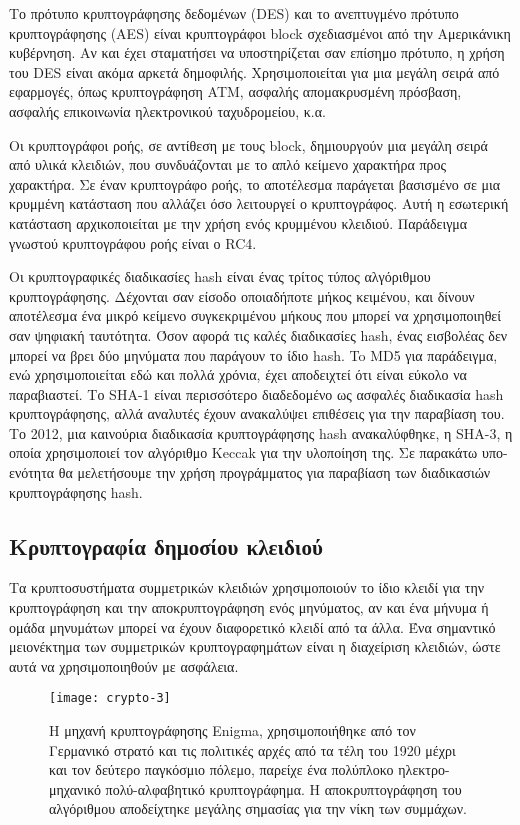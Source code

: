 Το πρότυπο κρυπτογράφησης δεδομένων (DES) και το ανεπτυγμένο πρότυπο κρυπτογράφησης (AES) είναι κρυπτογράφοι block σχεδιασμένοι από την Αμερικάνικη κυβέρνηση. Αν και έχει σταματήσει να υποστηρίζεται σαν επίσημο πρότυπο, η χρήση του DES είναι ακόμα αρκετά δημοφιλής. Χρησιμοποιείται για μια μεγάλη σειρά από εφαρμογές, όπως κρυπτογράφηση ATM, ασφαλής απομακρυσμένη πρόσβαση, ασφαλής επικοινωνία ηλεκτρονικού ταχυδρομείου, κ.α.

Οι κρυπτογράφοι ροής, σε αντίθεση με τους block, δημιουργούν μια μεγάλη σειρά από υλικά κλειδιών, που συνδυάζονται με το απλό κείμενο χαρακτήρα προς χαρακτήρα. Σε έναν κρυπτογράφο ροής, το αποτέλεσμα παράγεται βασισμένο σε μια κρυμμένη κατάσταση που αλλάζει όσο λειτουργεί ο κρυπτογράφος. Αυτή η εσωτερική κατάσταση αρχικοποιείται με την χρήση ενός κρυμμένου κλειδιού. Παράδειγμα γνωστού κρυπτογράφου ροής είναι ο RC4.

Οι κρυπτογραφικές διαδικασίες hash είναι ένας τρίτος τύπος αλγόριθμου κρυπτογράφησης. Δέχονται σαν είσοδο οποιαδήποτε μήκος κειμένου, και δίνουν αποτέλεσμα ένα μικρό κείμενο συγκεκριμένου μήκους που μπορεί να χρησιμοποιηθεί σαν ψηφιακή ταυτότητα. Όσον αφορά τις καλές διαδικασίες hash, ένας εισβολέας δεν μπορεί να βρει δύο μηνύματα που παράγουν το ίδιο hash. To MD5 για παράδειγμα, ενώ χρησιμοποιείται εδώ και πολλά χρόνια, έχει αποδειχτεί ότι είναι εύκολο να παραβιαστεί. Το SHA-1 είναι περισσότερο διαδεδομένο ως ασφαλές διαδικασία hash κρυπτογράφησης, αλλά αναλυτές έχουν ανακαλύψει επιθέσεις για την παραβίαση του. Το 2012, μια καινούρια διαδικασία κρυπτογράφησης hash ανακαλύφθηκε, η SHA-3, η οποία χρησιμοποιεί τον αλγόριθμο Keccak για την υλοποίηση της. Σε παρακάτω υπο-ενότητα θα μελετήσουμε την χρήση προγράμματος για παραβίαση των διαδικασιών κρυπτογράφησης hash.
\subsection{Κρυπτογραφία δημοσίου κλειδιού}
Τα κρυπτοσυστήματα συμμετρικών κλειδιών χρησιμοποιούν το ίδιο κλειδί για την κρυπτογράφηση και την αποκρυπτογράφηση ενός μηνύματος, αν και ένα μήνυμα ή ομάδα μηνυμάτων μπορεί να έχουν διαφορετικό κλειδί από τα άλλα. Ένα σημαντικό μειονέκτημα των συμμετρικών κρυπτογραφημάτων είναι η διαχείριση κλειδιών, ώστε αυτά να χρησιμοποιηθούν με ασφάλεια. 

\begin{figure}[h]
\centering
\texttt{[image: crypto-3]}
\caption{Η μηχανή κρυπτογράφησης Enigma, χρησιμοποιήθηκε από τον Γερμανικό στρατό και τις πολιτικές αρχές από τα τέλη του 1920 μέχρι και τον δεύτερο παγκόσμιο πόλεμο, παρείχε ένα πολύπλοκο ηλεκτρο-μηχανικό πολύ-αλφαβητικό κρυπτογράφημα. H αποκρυπτογράφηση του αλγόριθμου αποδείχτηκε μεγάλης σημασίας για την νίκη των συμμάχων.}
\end{figure}


